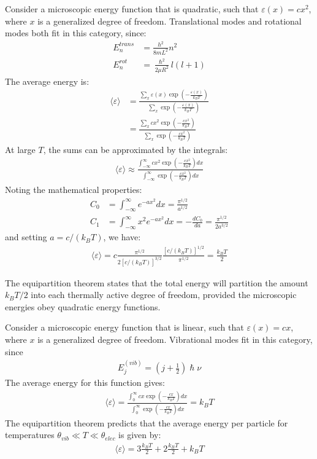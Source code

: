 \documentclass[book.tex]{subfiles}
\begin{document}
Consider a microscopic energy function that is quadratic, such that $\varepsilon(x) = cx^2$, where $x$ is a generalized degree of freedom. Translational modes and rotational modes both fit in this category,
since: 
\begin{align}
E_n^{trans} &= \frac{h^2}{8mL^2}n^2\\ E_n^{rot} &= \frac{\hslash^2}{2\mu R^2} l(l+1)
\end{align}
The average energy is:
\begin{align}
\langle \varepsilon \rangle &= \frac{\sum_x \varepsilon (x) \exp \left(-\frac{\varepsilon (x)}{k_BT}\right)}{\sum_x \exp \left(-\frac{\varepsilon (x)}{k_BT}\right)} \\
&= \frac{\sum_x cx^2 \exp \left(-\frac{cx^2}{k_BT}\right)}{\sum_x \exp \left(-\frac{cx^2}{k_BT}\right)}
\end{align}
At large $T$, the sums can be approximated by the integrals:
\begin{align}
\langle \varepsilon \rangle \approx \frac{\int_{-\infty}^{\infty}  cx^2 \exp \left(-\frac{cx^2}{k_BT}\right)dx}{\int_{-\infty}^{\infty} \exp \left(-\frac{cx^2}{k_BT} \right)dx}
\end{align}
Noting the mathematical properties:
\begin{align}
C_0 &= \int_{-\infty}^{\infty}  e^{-ax^2} dx = \frac{\pi^{1/2}}{a^{1/2}}\\
C_1 &= \int_{-\infty}^{\infty} x^2e^{-ax^2} dx   = -\frac{dC_0}{da}=\frac{\pi^{1/2}}{2a^{3/2}}
\end{align}
and setting $a = c/(k_BT)$, we have:
\begin{align}\label{Eq21}
\langle \varepsilon \rangle = c \frac{\pi^{1/2}}{2\left[c/(k_BT)\right]^{3/2}} \frac{\left[c/(k_BT)\right]^{1/2}}{\pi^{1/2}} = \frac{k_BT}{2}
\end{align}

The equipartition theorem states that the total energy will partition the amount $k_BT/2$ into each thermally active degree of freedom, provided the microscopic energies obey quadratic energy functions.

Consider a microscopic energy function that is linear, such that $\varepsilon(x) = cx$, where $x$ is a generalized degree of freedom. Vibrational modes fit in this category, since 
\begin{align}
E^{(vib)}_j = \left(j + \frac{1}{2}\right)\hslash \nu
\end{align}
The average energy for this function gives:
\begin{align}\label{Eq22}
\langle \varepsilon \rangle = \frac{\int_{0}^{\infty}  cx \exp \left(-\frac{cx}{k_BT}\right)dx}{\int_{0}^{\infty} \exp \left(-\frac{cx}{k_BT} \right)dx} = k_BT
\end{align}
The equipartition theorem predicts that the average energy per
particle for temperatures $\theta_{vib} \ll T \ll  \theta_{elec} $ is given by:
\begin{align}\label{Eq23}
\langle \varepsilon \rangle = 3\frac{k_BT}{2} + 2\frac{k_BT}{2} + k_BT
\end{align}
\end{document}
